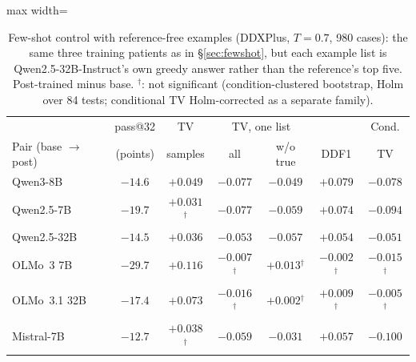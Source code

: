 \documentclass[wcp]{jmlr}
\begin{document}
\begin{table}[t]
\centering\small
\begin{adjustbox}{max width=\linewidth}
\begin{tabular}{lcccccc}
\toprule
 & pass@32 & TV & \multicolumn{2}{c}{TV, one list} & & Cond. \\
Pair (base $\rightarrow$ post) & (points) & samples & all & w/o true & DDF1 & TV \\
\midrule
Qwen3-8B & $-14.6$ & $+0.049$ & $-0.077$ & $-0.049$ & $+0.079$ & $-0.078$ \\
Qwen2.5-7B & $-19.7$ & $+0.031$$^{\dagger}$ & $-0.077$ & $-0.059$ & $+0.074$ & $-0.094$ \\
Qwen2.5-32B & $-14.5$ & $+0.036$ & $-0.053$ & $-0.057$ & $+0.054$ & $-0.051$ \\
OLMo~3 7B & $-29.7$ & $+0.116$ & $-0.007$$^{\dagger}$ & $+0.013$$^{\dagger}$ & $-0.002$$^{\dagger}$ & $-0.015$$^{\dagger}$ \\
OLMo~3.1 32B & $-17.4$ & $+0.073$ & $-0.016$$^{\dagger}$ & $+0.002$$^{\dagger}$ & $+0.009$$^{\dagger}$ & $-0.005$$^{\dagger}$ \\
Mistral-7B & $-12.7$ & $+0.038$$^{\dagger}$ & $-0.059$ & $-0.031$ & $+0.057$ & $-0.100$ \\
\bottomrule
\end{tabular}
\end{adjustbox}
\caption{Few-shot control with reference-free examples (DDXPlus, $T{=}0.7$, 980 cases): the same three training patients as in \S\ref{sec:fewshot}, but each example list is Qwen2.5-32B-Instruct's own greedy answer rather than the reference's top five. Post-trained minus base. $^{\dagger}$: not significant (condition-clustered bootstrap, Holm over 84 tests; conditional TV Holm-corrected as a separate family).}
\label{tab:refree}
\end{table}
\end{document}
